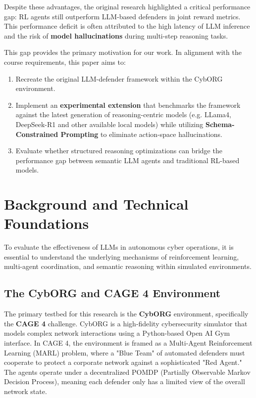 \documentclass[letterpaper, 10 pt, conference]{ieeeconf}
\begin{document}
Despite these advantages, the original research highlighted a critical performance gap: RL agents still outperform LLM-based defenders in joint reward metrics. This performance deficit is often attributed to the high latency of LLM inference and the risk of \textbf{model hallucinations} during multi-step reasoning tasks. 

This gap provides the primary motivation for our work. In alignment with the course requirements, this paper aims to:
\begin{enumerate}
    \item Recreate the original LLM-defender framework within the CybORG environment.
    \item Implement an \textbf{experimental extension} that benchmarks the framework against the latest generation of reasoning-centric models (e.g. LLama4, DeepSeek-R1 and other available local models) while utilizing \textbf{Schema-Constrained Prompting} to eliminate action-space hallucinations.
    \item Evaluate whether structured reasoning optimizations can bridge the performance gap between semantic LLM agents and traditional RL-based models.
\end{enumerate}

\section{Background and Technical Foundations}
To evaluate the effectiveness of LLMs in autonomous cyber operations, it is essential to understand the underlying mechanisms of reinforcement learning, multi-agent coordination, and semantic reasoning within simulated environments.

\subsection{The CybORG and CAGE 4 Environment}
The primary testbed for this research is the \textbf{CybORG} environment, specifically the \textbf{CAGE 4} challenge. CybORG is a high-fidelity cybersecurity simulator that models complex network interactions using a Python-based Open AI Gym interface. In CAGE 4, the environment is framed as a Multi-Agent Reinforcement Learning (MARL) problem, where a "Blue Team" of automated defenders must cooperate to protect a corporate network against a sophisticated "Red Agent." The agents operate under a decentralized POMDP (Partially Observable Markov Decision Process), meaning each defender only has a limited view of the overall network state.
\end{document}
